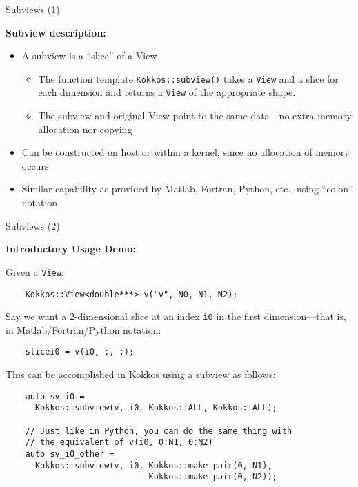 \begin{frame}[fragile]{Subviews (1)}

  \textbf{Subview description:}

  \vspace{5pt}

  \begin{itemize}
    \item{A subview is a ``slice'' of a View}
    \pause
    \begin{itemize}
      \item{The function template \texttt{Kokkos::subview()} takes a \texttt{View} and a slice for each dimension and returns a \texttt{View} of the appropriate shape.}
      \pause
      \item{The subview and original View point to the same data---no extra memory allocation nor copying}        
    \end{itemize}
    \pause
    \item{Can be constructed on host or within a kernel, since no allocation of memory occurs}
    \pause
    \item{Similar capability as provided by Matlab, Fortran, Python, etc., using ``colon'' notation}
  \end{itemize}

\end{frame}


\begin{frame}[fragile]{Subviews (2)}

  \textbf{Introductory Usage Demo:}

  \vspace{5pt}

  {Given a \texttt{View}:}


  \begin{lstlisting}
    Kokkos::View<double***> v("v", N0, N1, N2);
  \end{lstlisting}
  
  \pause

  {Say we want a 2-dimensional slice at an index \texttt{i0} in the first dimension---that is, in Matlab/Fortran/Python notation:}
  \begin{lstlisting}
    slicei0 = v(i0, :, :);
  \end{lstlisting}

  \pause
  {This can be accomplished in Kokkos using a subview as follows:}
  \begin{lstlisting}
    auto sv_i0 = 
      Kokkos::subview(v, i0, Kokkos::ALL, Kokkos::ALL);

    // Just like in Python, you can do the same thing with
    // the equivalent of v(i0, 0:N1, 0:N2)
    auto sv_i0_other = 
      Kokkos::subview(v, i0, Kokkos::make_pair(0, N1),
                             Kokkos::make_pair(0, N2));
  \end{lstlisting}

\end{frame}


